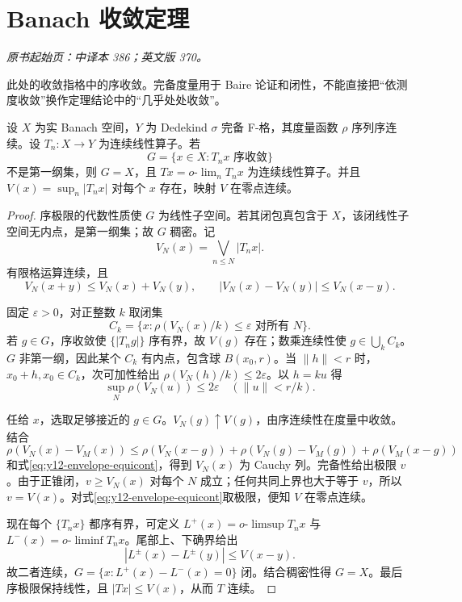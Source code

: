 \section{Banach 收敛定理}\label{sec:yosida-12-04}
\noindent\textit{原书起始页：中译本 386；英文版 370。}

此处的收敛指格中的序收敛。完备度量用于 Baire 论证和闭性，不能直接把“依测度收敛”换作定理结论中的“几乎处处收敛”。

\begin{theorem}\label{thm:y12-banach-convergence}
设 $X$ 为实 Banach 空间，$Y$ 为 Dedekind $\sigma$ 完备 F-格，其度量函数 $\rho$ 序列序连续。设 $T_n:X\to Y$ 为连续线性算子。若
\[
 G=\{x\in X:T_nx\text{ 序收敛}\}
\]
不是第一纲集，则 $G=X$，且 $Tx=o\text{-}\lim_nT_nx$ 为连续线性算子。并且 $V(x)=\sup_n|T_nx|$ 对每个 $x$ 存在，映射 $V$ 在零点连续。
\end{theorem}
\begin{proof}
序极限的代数性质使 $G$ 为线性子空间。若其闭包真包含于 $X$，该闭线性子空间无内点，是第一纲集；故 $G$ 稠密。记
\[
 V_N(x)=\bigvee_{n\le N}|T_nx|.
\]
有限格运算连续，且
\[
 V_N(x+y)\le V_N(x)+V_N(y),\qquad
 |V_N(x)-V_N(y)|\le V_N(x-y).
\]

固定 $\varepsilon>0$，对正整数 $k$ 取闭集
\[
 C_k=\{x:\rho(V_N(x)/k)\le\varepsilon\text{ 对所有 }N\}.
\]
若 $g\in G$，序收敛使 $\{|T_ng|\}$ 序有界，故 $V(g)$ 存在；数乘连续性使 $g\in\bigcup_kC_k$。$G$ 非第一纲，因此某个 $C_k$ 有内点，包含球 $B(x_0,r)$。当 $\|h\|<r$ 时，$x_0+h,x_0\in C_k$，次可加性给出 $\rho(V_N(h)/k)\le2\varepsilon$。以 $h=ku$ 得
\begin{equation}\label{eq:y12-envelope-equicont}
 \sup_N\rho(V_N(u))\le2\varepsilon\quad(\|u\|<r/k).
\end{equation}

任给 $x$，选取足够接近的 $g\in G$。$V_N(g)\uparrow V(g)$，由序连续性在度量中收敛。结合
\[
 \rho(V_N(x)-V_M(x))\le
 \rho(V_N(x-g))+\rho(V_N(g)-V_M(g))+\rho(V_M(x-g))
\]
和式\eqref{eq:y12-envelope-equicont}，得到 $V_N(x)$ 为 Cauchy 列。完备性给出极限 $v$。由于正锥闭，$v\ge V_N(x)$ 对每个 $N$ 成立；任何共同上界也大于等于 $v$，所以 $v=V(x)$。对式\eqref{eq:y12-envelope-equicont}取极限，便知 $V$ 在零点连续。

现在每个 $\{T_nx\}$ 都序有界，可定义 $L^+(x)=o\text{-}\limsup T_nx$ 与 $L^-(x)=o\text{-}\liminf T_nx$。尾部上、下确界给出
\[
 |L^\pm(x)-L^\pm(y)|\le V(x-y).
\]
故二者连续，$G=\{x:L^+(x)-L^-(x)=0\}$ 闭。结合稠密性得 $G=X$。最后序极限保持线性，且 $|Tx|\le V(x)$，从而 $T$ 连续。
\end{proof}

